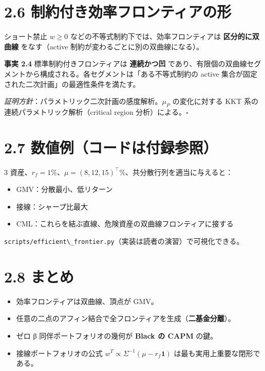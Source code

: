 \documentclass[11pt,a4paper]{report}
\begin{document}
\section{2.6 制約付き効率フロンティアの形}

ショート禁止 $w \ge 0$ などの不等式制約下では、効率フロンティアは \textbf{区分的に双曲線} をなす（active 制約が変わるごとに別の双曲線になる）。

\textbf{事実 2.4} 標準制約付きフロンティアは \textbf{連続かつ凹} であり、有限個の双曲線セグメントから構成される。各セグメントは「ある不等式制約の active 集合が固定された二次計画」の最適性条件を満たす。

\emph{証明方針}：パラメトリック二次計画の感度解析。$\mu_P$ の変化に対する KKT 系の連続パラメトリック解析（critical region 分析）による。$\square$

\section{2.7 数値例（コードは付録参照）}

3 資産、$r_f = 1\%$、$\mu = (8, 12, 15)^\top$\%、共分散行列を適当に与えると：
\begin{itemize}
\item GMV：分散最小、低リターン
\item 接線：シャープ比最大
\item CML：これらを結ぶ直線、危険資産の双曲線フロンティアに接する
\end{itemize}

\texttt{scripts/efficient\textbackslash{}\_frontier.py}（実装は読者の演習）で可視化できる。

\section{2.8 まとめ}

\begin{itemize}
\item 効率フロンティアは双曲線、頂点が GMV。
\item 任意の二点のアフィン結合で全フロンティアを生成（\textbf{二基金分離}）。
\item ゼロ β 同伴ポートフォリオの幾何が \textbf{Black の CAPM} の鍵。
\item 接線ポートフォリオの公式 $w^T \propto \Sigma^{-1}(\mu - r_f\mathbf{1})$ は最も実用上重要な閉形である。
\end{itemize}

\noindent\hrulefill
\end{document}
